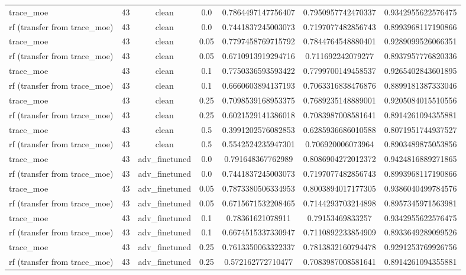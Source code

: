 \begin{table}[htbp]
\begin{tabular}{lcccccc}
trace\_moe & 43 & clean & 0.0 & 0.7864497147756407 & 0.7950957742470337 & 0.9342955622576475 \\
rf (transfer from trace\_moe) & 43 & clean & 0.0 & 0.7441837245003073 & 0.7197077482856743 & 0.8993968117190866 \\
trace\_moe & 43 & clean & 0.05 & 0.7797458769715792 & 0.7844764548880401 & 0.9289099526066351 \\
rf (transfer from trace\_moe) & 43 & clean & 0.05 & 0.6710913919294716 & 0.711692242079277 & 0.8937957776820336 \\
trace\_moe & 43 & clean & 0.1 & 0.7750336593593422 & 0.7799700149458537 & 0.9265402843601895 \\
rf (transfer from trace\_moe) & 43 & clean & 0.1 & 0.6660603894137193 & 0.7063316838476876 & 0.8899181387333046 \\
trace\_moe & 43 & clean & 0.25 & 0.7098539168953375 & 0.7689235148889001 & 0.9205084015510556 \\
rf (transfer from trace\_moe) & 43 & clean & 0.25 & 0.6021529141386018 & 0.7083987008581641 & 0.8914261094355881 \\
trace\_moe & 43 & clean & 0.5 & 0.3991202576082853 & 0.6285936686010588 & 0.8071951744937527 \\
rf (transfer from trace\_moe) & 43 & clean & 0.5 & 0.5542524235947301 & 0.706920006073964 & 0.8903489875053856 \\
trace\_moe & 43 & adv\_finetuned & 0.0 & 0.791648367762989 & 0.8086904272012372 & 0.9424816889271865 \\
rf (transfer from trace\_moe) & 43 & adv\_finetuned & 0.0 & 0.7441837245003073 & 0.7197077482856743 & 0.8993968117190866 \\
trace\_moe & 43 & adv\_finetuned & 0.05 & 0.7873380506334953 & 0.8003894017177305 & 0.9386040499784576 \\
rf (transfer from trace\_moe) & 43 & adv\_finetuned & 0.05 & 0.6715671532208465 & 0.7144293703214898 & 0.8957345971563981 \\
trace\_moe & 43 & adv\_finetuned & 0.1 & 0.78361621078911 & 0.79153469833257 & 0.9342955622576475 \\
rf (transfer from trace\_moe) & 43 & adv\_finetuned & 0.1 & 0.6674515337330947 & 0.7110892233854909 & 0.8933649289099526 \\
trace\_moe & 43 & adv\_finetuned & 0.25 & 0.7613350063322337 & 0.7813832160794478 & 0.9291253769926756 \\
rf (transfer from trace\_moe) & 43 & adv\_finetuned & 0.25 & 0.572162772710477 & 0.7083987008581641 & 0.8914261094355881 \\

\end{tabular}
\end{table}
